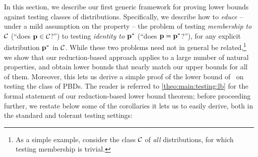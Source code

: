 In this section, we describe our first generic framework for proving lower bounds against testing classes of distributions. Specifically, we describe how to \emph{educe} -- under a mild assumption on the property \class{} -- the problem of testing \emph{membership to $\mathcal{C}$} (``does $\mathbf{p}\in\mathcal{C}$?'') to testing \emph{identity to $\mathbf{p}^\ast$} (``does $\mathbf{p}=\mathbf{p}^\ast$?''), for any explicit distribution $\mathbf{p}^\ast$ in $\mathcal{C}$. While these two problems need not in general be related,\footnote{As a simple example, consider the class $\mathcal{C}$ of \emph{all} distributions, for which testing membership is trivial.} we show that our reduction-based approach applies to a large number of natural properties, and obtain lower bounds that nearly match our upper bounds for all of them. Moreover, this lets us derive a simple proof of the lower bound of~\cite{AD:15} on testing the class of PBDs.
The reader is referred to \cref{theo:main:testing:lb} for the formal statement of our reduction-based lower bound theorem; before proceeding further, we restate below some of the corollaries it lets us to easily derive, both in the standard and tolerant testing settings:

\corolbsqrtn*
\corolbpbd*
\corolbksiirv*
\corolbtolnlogn*
\corolbtolpbd*


